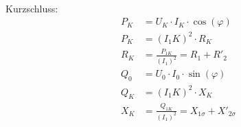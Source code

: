 \begin{enumerate}[label=\alph*)]
\begin{minipage}{0.5\textwidth}
\begin{align*}
		      \end{align*}
	      \end{minipage}\hfill
	      \begin{minipage}{0.5\textwidth}
		      Kurzschluss:
		      \begin{align*}
			      P_K & = U_K \cdot I_K \cdot \cos(\varphi)                    \\
			      P_K & ={(I_1K)^2}\cdot  {R_K}                                \\
			      R_K & = \frac{P_{1K}}{(I_1)^2} = R_1 + R'_2                  \\
			      Q_0 & = U_0 \cdot I_0 \cdot \sin(\varphi)                    \\
			      Q_K & = {(I_1K)^2}\cdot{X_K}                                 \\
			      X_K & = \frac{Q_{1K}}{(I_1)^2} =  X_{1\sigma} + X'_{2\sigma} \\
		      \end{align*}
	      \end{minipage}


\end{enumerate}
